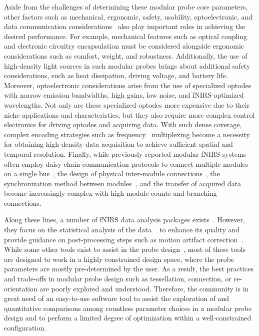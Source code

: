 Aside from the challenges of determining these modular probe core parameters, other factors such as mechanical, ergonomic, safety, usability, optoelectronic, and data communication considerations~\cite{Zhao2017} also play important roles in achieving the desired performance. For example, mechanical features such as optical coupling and electronic circuitry encapsulation must be considered alongside ergonomic considerations such as comfort, weight, and robustness. Additionally, the use of high-density light sources in such modular probes brings about additional safety considerations, such as heat dissipation, driving voltage, and battery life. Moreover, optoelectronic considerations arise from the use of specialized optodes with narrow emission bandwidths, high gains, low noise, and \ac{fNIRS}-optimized wavelengths. Not only are these specialized optodes more expensive due to their niche applications and characteristics, but they also require more complex control electronics for driving optodes and acquiring data. With such dense coverage, complex encoding strategies such as frequency~\cite{Maki1995} multiplexing become a necessity for obtaining high-density data acquisition to achieve sufficient spatial and temporal resolution. Finally, while previously reported modular \ac{fNIRS} systems often employ daisy-chain communication protocols to connect multiple modules on a single bus~\cite{Chitnis2016, Bci2017, Zimmermann2013, Funane2017, Zhao2019}, the design of physical inter-module connections~\cite{Zhao2021}, the synchronization method between modules~\cite{Zhao2017}, and the transfer of acquired data become increasingly complex with high module counts and branching connections.

Along these lines, a number of \ac{fNIRS} data analysis packages exists~\cite{Huppert2009, Santosa2018, Hernandez2020}. However, they focus on the statistical analysis of the data ~\cite{Hernandez2020,Huppert2009, Santosa2018} to enhance its quality and provide guidance on post-processing steps such as motion artifact correction~\cite{Huppert2009}. While some other tools exist to assist in the probe design~\cite{Brigadoi2018, Machado2018, ZimeoMorais2018, Aasted2015}, most of these tools are designed to work in a highly constrained design space, where the probe parameters are mostly pre-determined by the user. As a result, the best practices and trade-offs in modular probe design such as tessellation, connection, or re-orientation are poorly explored and understood. Therefore, the community is in great need of an easy-to-use software tool to assist the exploration of and quantitative comparisons among countless parameter choices in a modular probe design and to perform a limited degree of optimization within a well-constrained configuration. 

